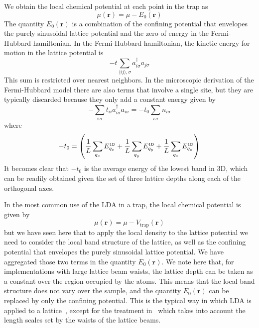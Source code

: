 \documentclass[11pt,letter]{article}
\newcommand{\bv}[1]{\ensuremath{\bm{#1}}}
\begin{document}
We obtain the local chemical potential at each point in the trap as  
\begin{equation}
 \mu(\bv{r}) = \mu - E_{0}(\bv{r}) 
\end{equation}
The quantity $E_{0}(\bv{r})$ is a combination of the confining potential that
envelopes the purely sinusoidal lattice potential and the zero of energy in the
Fermi-Hubbard hamiltonian.   In the Fermi-Hubbard hamiltonian, the kinetic
energy for motion in the lattice potential is 
\begin{equation}
-t \sum_{ \langle ij \rangle, \sigma   } 
          a_{i\sigma}^{\dagger}a_{j\sigma} 
\end{equation} 
This sum is restricted over nearest neighbors.  In the microscopic derivation
of the Fermi-Hubbard model there are also terms that involve a single site,
but they are typically discarded because they only add a constant energy given
by 
\begin{equation}
-\sum_{i\,\sigma} t_{ii} 
          a_{i\sigma}^{\dagger}a_{i \sigma}  = - t_{0} \sum_{i\,\sigma} n_{i\sigma} 
\end{equation}
where 
\begin{equation}
 - t_{0} = \left( 
          \frac{1}{L} \sum_{q_{x}} E_{q_x}^{\text{\tiny 1D}} 
         + \frac{1}{L} \sum_{q_{y}} E_{q_y}^{\text{\tiny 1D}} 
         + \frac{1}{L} \sum_{q_{z}} E_{q_z}^{\text{\tiny 1D}} 
    \right)
\end{equation}
It becomes clear that $-t_{0}$ is the average energy of the lowest band in 3D,
which can be readily obtained given the set of three lattice depths along each
of the orthogonal axes.   

In the most common use of the LDA in a trap, the local
chemical potential is given by 
\begin{equation}
 \mu(\bv{r}) = \mu - V_{\text{trap}}(\bv{r}) 
\end{equation}
but we have seen here that to apply the local density to the lattice potential
we need to consider the local band structure of the lattice, as well as the
confining potential that envelopes the purely sinusoidal lattice potential.  We
have aggregated those two terms in the quantity $E_{0}(\bv{r})$.  We note here
that, for implementations with large lattice beam waists, the lattice depth can
be taken as a constant over the region occupied by the atoms.  This means that
the local band structure does not vary over the sample, and the quantity
$E_{0}(\bv{r})$ can be replaced by only the confining potential.  This is the
typical way in which LDA is applied to a
lattice~\cite{DeLeo2008,DeLeo2011,Gorelik2010,Fuchs2011}, except for the
treatment in~\cite{Mathy2012} which takes into account the length scales set by
the waists of the lattice beams. 
\end{document}
